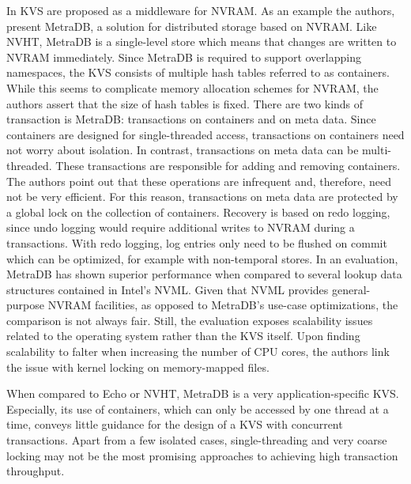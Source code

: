 In \cite{marmol2016nonvolatile} KVS are proposed as a middleware for NVRAM. As
an example the authors, present MetraDB, a solution for distributed storage
based on NVRAM. Like NVHT, MetraDB is a single-level store which means that
changes are written to NVRAM immediately. Since MetraDB is required to support
overlapping namespaces, the KVS consists of multiple hash tables referred to as
containers. While this seems to complicate memory allocation schemes for NVRAM,
the authors assert that the size of hash tables is fixed. There are two kinds of
transaction is MetraDB: transactions on containers and on meta data. Since
containers are designed for single-threaded access, transactions on containers
need not worry about isolation. In contrast, transactions on meta data can be
multi-threaded. These transactions are responsible for adding and removing
containers. The authors point out that these operations are infrequent and,
therefore, need not be very efficient. For this reason, transactions on meta
data are protected by a global lock on the collection of containers. Recovery is
based on redo logging, since undo logging would require additional writes to
NVRAM during a transactions. With redo logging, log entries only need to be
flushed on commit which can be optimized, for example with non-temporal stores.
In an evaluation, MetraDB has shown superior performance when compared to
several lookup data structures contained in Intel's NVML. Given that NVML
provides general-purpose NVRAM facilities, as opposed to MetraDB's use-case
optimizations, the comparison is not always fair. Still, the evaluation exposes
scalability issues related to the operating system rather than the KVS itself.
Upon finding scalability to falter when increasing the number of CPU cores, the
authors link the issue with kernel locking on memory-mapped files.

When compared to Echo or NVHT, MetraDB is a very application-specific KVS.
Especially, its use of containers, which can only be accessed by one thread at a
time, conveys little guidance for the design of a KVS with concurrent
transactions. Apart from a few isolated cases, single-threading and very coarse
locking may not be the most promising approaches to achieving high transaction
throughput.
